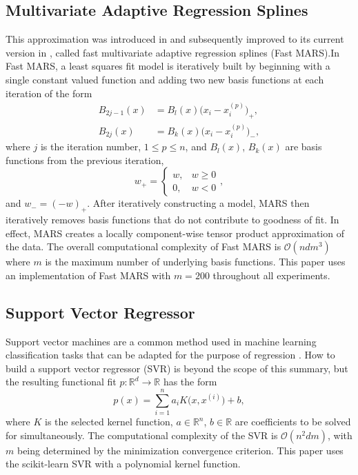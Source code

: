 \documentclass[smallextended,final]{svjour3}       %
\begin{document}
\subsection{Multivariate Adaptive Regression Splines}
\label{sec:mars}
This approximation was introduced in \cite{friedman1991multivariate} and subsequently improved to its current version in \cite{stanford1993fast}, called fast multivariate adaptive regression splines (Fast MARS).In Fast MARS, a least squares fit model is iteratively built by beginning with a single constant valued function and adding two new basis functions at each iteration of the form
\begin{align*}
  B_{2j-1}(x) &= B_l(x) \bigl(x_i-x^{(p)}_i\bigr)_+, \\
  B_{2j}(x) &= B_k(x) \bigl(x_i-x^{(p)}_i\bigr)_- ,
\end{align*}
where $j$ is the iteration number, $1 \le p \le n$, and $B_l(x)$, $B_k(x)$ are basis functions from the previous iteration,
$$w_+ = \begin{cases} w, & w \geq 0 \\ 0, & w < 0 \end{cases},$$
and $w_- = (-w)_+$. After iteratively constructing a model, MARS then iteratively removes basis functions that do not contribute to goodness of fit. In effect, MARS creates a locally component-wise tensor product approximation of the data. The overall computational complexity of Fast MARS is $\mathcal{O}(n d m^3)$ where $m$ is the maximum number of underlying basis functions. This paper uses an implementation of Fast MARS \cite{rudy2017pyearth} with $m = 200$ throughout all experiments.

\subsection{Support Vector Regressor}
\label{sec:svr}
Support vector machines are a common method used in machine learning
classification tasks that can be adapted for the purpose of regression
\cite{basak2007support}. How to build a support vector regressor (SVR) is
beyond the scope of this summary, but the resulting functional fit $p :
\mathbb{R}^d \rightarrow \mathbb{R}$ has the form
 $$ p(x)  = \sum_{i=1}^{n}a_i K\bigl(x,x^{(i)}\bigr) + b ,$$
where $K$ is the selected kernel function, $a \in \mathbb{R}^n$, $b \in
\mathbb{R}$ are coefficients to be solved for simultaneously. The
computational complexity of the SVR is $\mathcal{O}(n^2dm)$, with $m$ being
determined by the minimization convergence criterion. This paper uses the
scikit-learn SVR \cite{scikit-learn} with a polynomial kernel function.
\end{document}
